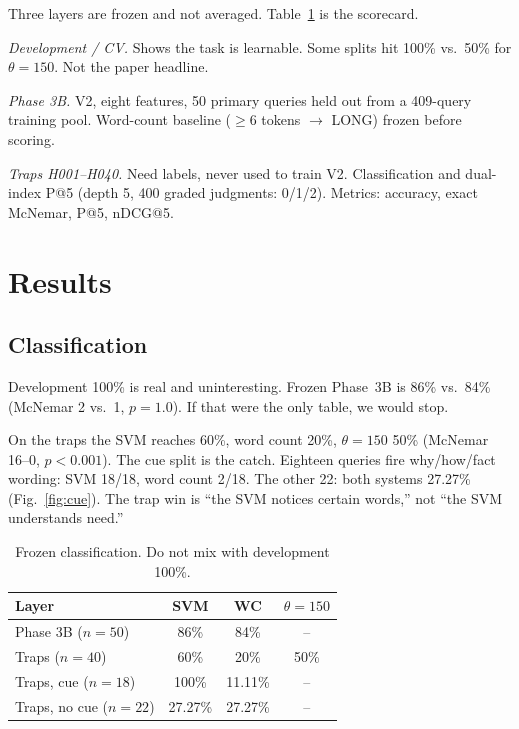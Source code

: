 \documentclass[conference]{IEEEtran}
\begin{document}
Three layers are frozen and not averaged. Table~\ref{tab:cls} is the scorecard.

\textit{Development / CV.} Shows the task is learnable. Some splits hit 100\% vs.\ 50\% for $\theta=150$. Not the paper headline.

\textit{Phase 3B.} V2, eight features, 50 primary queries held out from a 409-query training pool. Word-count baseline ($\geq 6$ tokens $\rightarrow$ LONG) frozen before scoring.

\textit{Traps H001--H040.} Need labels, never used to train V2. Classification and dual-index P@5 (depth 5, 400 graded judgments: 0/1/2). Metrics: accuracy, exact McNemar, P@5, nDCG@5.

\section{Results}

\subsection{Classification}

Development 100\% is real and uninteresting. Frozen Phase~3B is 86\% vs.\ 84\% (McNemar 2 vs.\ 1, $p=1.0$). If that were the only table, we would stop.

On the traps the SVM reaches 60\%, word count 20\%, $\theta=150$ 50\% (McNemar 16--0, $p<0.001$). The cue split is the catch. Eighteen queries fire why/how/fact wording: SVM 18/18, word count 2/18. The other 22: both systems 27.27\% (Fig.~\ref{fig:cue}). The trap win is ``the SVM notices certain words,'' not ``the SVM understands need.''

\begin{table}[t]
\caption{Frozen classification. Do not mix with development 100\%.}
\label{tab:cls}
\centering
\begin{tabular}{lccc}
\toprule
\textbf{Layer} & \textbf{SVM} & \textbf{WC} & \textbf{$\theta{=}150$} \\
\midrule
Phase 3B ($n{=}50$) & 86\% & 84\% & -- \\
Traps ($n{=}40$) & 60\% & 20\% & 50\% \\
Traps, cue ($n{=}18$) & 100\% & 11.11\% & -- \\
Traps, no cue ($n{=}22$) & 27.27\% & 27.27\% & -- \\
\bottomrule
\end{tabular}
\end{table}
\end{document}
